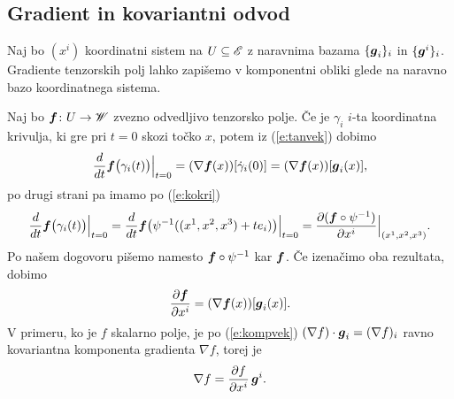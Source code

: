 \subsection{Gradient in kovariantni odvod}


Naj bo $(x^i)$ koordinatni sistem na $U\subseteq\mathscr E$ z naravnima bazama $\{\boldsymbol g_i\}_i$ in $\{\boldsymbol g^i\}_i$.
Gradiente tenzorskih polj lahko zapišemo v komponentni obliki glede na naravno bazo koordinatnega sistema.

Naj bo $\boldsymbol f\colon U\to\mathscr W$ zvezno odvedljivo tenzorsko polje. Če je $\gamma_i$ $i$-ta
koordinatna krivulja, ki gre pri $t=0$ skozi točko $x$, potem iz (\ref{e:tanvek}) dobimo
\begin{equation*}
	\frac{d}{dt}\boldsymbol f\big(\gamma_i(t)\big)\Big|_{t=0}=
	(\nabla \boldsymbol f(x))[\dot{\gamma}_i(0)]=(\nabla \boldsymbol f(x))[\boldsymbol g_i(x)],
\end{equation*}
po drugi strani pa imamo po (\ref{e:kokri})
\begin{equation*}
	\frac{d}{dt}\boldsymbol f\big(\gamma_i(t)\big)\Big|_{t=0}=
	\frac{d}{dt}\boldsymbol f\big(\psi^{-1}((x^1,x^2,x^3)+te_i)\big)\Big|_{t=0}=
	\frac{\partial(\boldsymbol f\circ\psi^{-1})}{\partial x^i}\Big|_{(x^1,x^2,x^3)}.
\end{equation*}
Po našem dogovoru pišemo namesto $\boldsymbol f\circ\psi^{-1}$ kar $\boldsymbol f$. Če izenačimo oba rezultata, dobimo
\begin{equation} \label{e:sotf}
	\frac{\partial\boldsymbol f}{\partial x^i}=(\nabla \boldsymbol f(x))[\boldsymbol g_i(x)].
\end{equation}
V primeru, ko je $f$ skalarno polje, je po (\ref{e:kompvek}) $(\nabla f)\cdot\boldsymbol g_i=(\nabla f)_i$
ravno kovariantna komponenta gradienta $\nabla f$, torej je
\begin{equation} \label{e:gradskal}
	\nabla f = \frac{\partial f}{\partial x^i}\,\boldsymbol g^i.
\end{equation}

